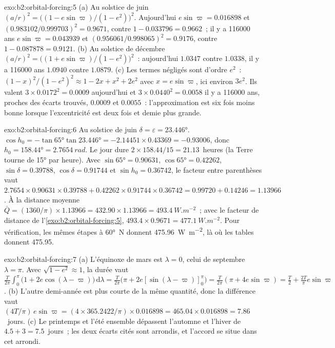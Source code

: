 \begin{solution}{exo:b2:orbital-forcing:5}
(a) Au solstice de juin $(a/r)^2 = \bigl((1 - e\sin\varpi)/(1 - e^2)\bigr)^2$. Aujourd'hui $e\sin\varpi
= 0.016898$ et $(0.983102/0.999703)^2 = 0.9671$, contre $1 - 0.033796 = 0.9662$~;
il y a \num{116000} ans $e\sin\varpi = 0.043939$ et $(0.956061/0.998065)^2 = 0.9176$, contre $1 -
0.087878 = 0.9121$. (b) Au solstice de décembre $(a/r)^2 = \bigl((1 + e\sin\varpi)/(1 -
e^2)\bigr)^2$~: aujourd'hui $1.0347$ contre $1.0338$, il y a \num{116000} ans $1.0940$ contre $1.0879$.
(c) Les termes négligés sont d'ordre $e^2$~: $(1 - x)^2/(1 - e^2)^2 \approx 1 - 2x + x^2 + 2e^2$
avec $x = e\sin\varpi$, ici environ $3e^2$. Ils valent $3 \times 0.0172^2 = 0.0009$ aujourd'hui et $3
\times 0.0440^2 = 0.0058$ il y a \num{116000} ans, proches des écarts trouvés, $0.0009$ et
$0.0055$~: l'approximation est six fois moins bonne lorsque l'excentricité est deux fois et demie
plus grande.
\end{solution}

\begin{solution}{exo:b2:orbital-forcing:6}
Au solstice de juin $\delta = \varepsilon = \ang{23.446}$. $\cos h_0 = -\tan\ang{65}\tan\ang{23.446}
= -2.14451 \times 0.43369 = -0.93006$, donc $h_0 = \ang{158.44} = \qty{2.7654}{rad}$. Le jour dure
$2 \times 158.44/15 = 21.13$~heures (la Terre tourne de \ang{15} par heure). Avec $\sin\ang{65} = 0.90631$,
$\cos\ang{65} = 0.42262$, $\sin\delta = 0.39788$, $\cos\delta = 0.91744$ et $\sin h_0 = 0.36742$,
le facteur entre parenthèses vaut $2.7654 \times 0.90631 \times 0.39788 + 0.42262 \times 0.91744 \times 0.36742 = 0.99720
+ 0.14246 = 1.13966$. À la distance moyenne $\bar Q = (1360/\pi) \times 1.13966 = 432.90 \times 1.13966
= \qty{493.4}{W.m^{-2}}$~; avec le facteur de distance de l'\cref{exo:b2:orbital-forcing:5}, $493.4 \times
0.9671 = \qty{477.1}{W.m^{-2}}$. Pour vérification, les mêmes étapes à \ang{60}~N donnent \qty{475.96}{W.m^{-2}}, là où les tables donnent \num{475.95}.
\end{solution}

\begin{solution}{exo:b2:orbital-forcing:7}
(a) L'équinoxe de mars est $\lambda = 0$, celui de septembre $\lambda = \pi$. Avec $\sqrt{1 - e^2}
\approx 1$, la durée vaut $\frac{T}{2\pi}\int_0^{\pi}\bigl(1 + 2e\cos(\lambda -
\varpi)\bigr)\,\mathrm d\lambda = \frac{T}{2\pi}\bigl(\pi + 2e[\sin(\lambda - \varpi)]_0^{\pi}\bigr)
= \frac{T}{2\pi}(\pi + 4e\sin\varpi) = \frac T2 + \frac{2T}{\pi}e\sin\varpi$. (b) L'autre demi-année
est plus courte de la même quantité, donc la différence vaut $(4T/\pi)\,e\sin\varpi = (4 \times
365.2422/\pi) \times 0.016898 = 465.04 \times 0.016898 = 7.86$~jours. (c) Le printemps et l'été ensemble
dépassent l'automne et l'hiver de $4.5 + 3 = 7.5$~jours~; les deux écarts cités sont arrondis, et l'accord
se situe dans cet arrondi.
\end{solution}

